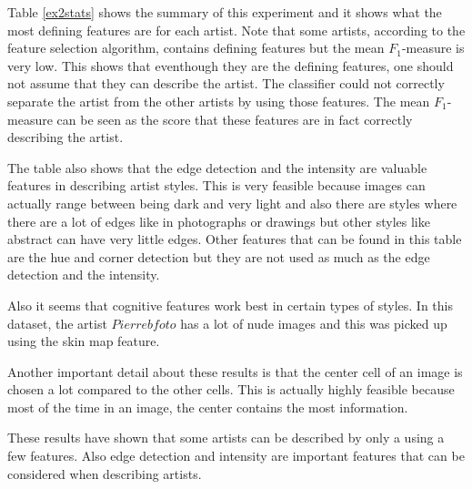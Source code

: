 Table \ref{ex2stats} shows the summary of this experiment and it shows what the most defining features are for each artist.
Note that some artists, according to the feature selection algorithm, contains defining features but the mean $F_1$-measure is very low.
This shows that eventhough they are the defining features, one should not assume that they can describe the artist.
The classifier could not correctly separate the artist from the other artists by using those features.
The mean $F_1$-measure can be seen as the score that these features are in fact correctly describing the artist.

The table also shows that the edge detection and the intensity are valuable features in describing artist styles.
This is very feasible because images can actually range between being dark and very light and also there are styles where there are a lot of edges like in photographs or drawings but other styles like abstract can have very little edges.
Other features that can be found in this table are the hue and corner detection but they are not used as much as the edge detection and the intensity.

Also it seems that cognitive features work best in certain types of styles.
In this dataset, the artist $Pierrebfoto$ has a lot of nude images and this was picked up using the skin map feature.

Another important detail about these results is that the center cell of an image is chosen a lot compared to the other cells.
This is actually highly feasible because most of the time in an image, the center contains the most information.

These results have shown that some artists can be described by only a using a few features.
Also edge detection and intensity are important features that can be considered when describing artists. 

